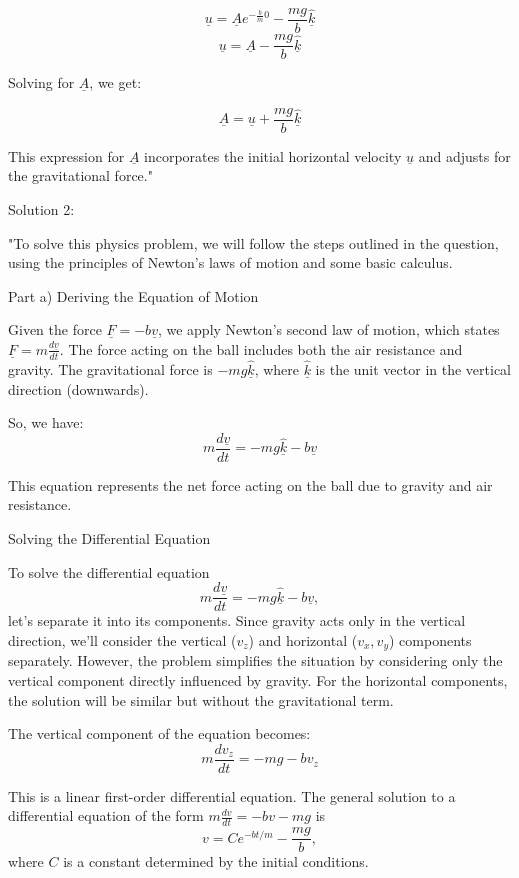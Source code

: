 \[ \underline{u} = \underline{A}e^{-\frac{b}{m}0} - \frac{mg}{b}\hat{\underline{k}} \]
\[ \underline{u} = \underline{A} - \frac{mg}{b}\hat{\underline{k}} \]

Solving for \( \underline{A} \), we get:

\[ \underline{A} = \underline{u} + \frac{mg}{b}\hat{\underline{k}} \]

This expression for \( \underline{A} \) incorporates the initial horizontal velocity \( \underline{u} \) and adjusts for the gravitational force."

Solution 2:

"To solve this physics problem, we will follow the steps outlined in the question, using the principles of Newton's laws of motion and some basic calculus.

Part a) Deriving the Equation of Motion

Given the force \( \underline{F} = - b \underline{v} \), we apply Newton's second law of motion, which states \( \underline{F} = m \frac{d\underline{v}}{dt} \). The force acting on the ball includes both the air resistance and gravity. The gravitational force is \( -mg \hat{\underline{k}} \), where \( \hat{\underline{k}} \) is the unit vector in the vertical direction (downwards).

So, we have:
\[
m\frac{d\underline{v}}{dt} = -mg\hat{\underline{k}} - b\underline{v}
\]

This equation represents the net force acting on the ball due to gravity and air resistance.

Solving the Differential Equation

To solve the differential equation
\[
m\frac{d\underline{v}}{dt} = -mg\hat{\underline{k}} - b\underline{v},
\]
let's separate it into its components. Since gravity acts only in the vertical direction, we'll consider the vertical (\(v_z\)) and horizontal (\(v_x, v_y\)) components separately. However, the problem simplifies the situation by considering only the vertical component directly influenced by gravity. For the horizontal components, the solution will be similar but without the gravitational term.

The vertical component of the equation becomes:
\[
m\frac{dv_z}{dt} = -mg - bv_z
\]

This is a linear first-order differential equation. The general solution to a differential equation of the form \(m\frac{dv}{dt} = -bv - mg\) is
\[
v = Ce^{-bt/m} - \frac{mg}{b},
\]
where \(C\) is a constant determined by the initial conditions.

